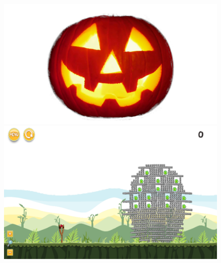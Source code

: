 \documentclass{dalthesis}
\begin{document}
\begin{figure}
  \includegraphics[width=\textwidth,height=\textheight,keepaspectratio]{levels/pictures/halloween/jack_o_lantern.jpg}
  \includegraphics[width=\textwidth,height=\textheight,keepaspectratio]{levels/screenshots/halloween/jack_o_lantern.png}
\end{figure}
\end{document}
